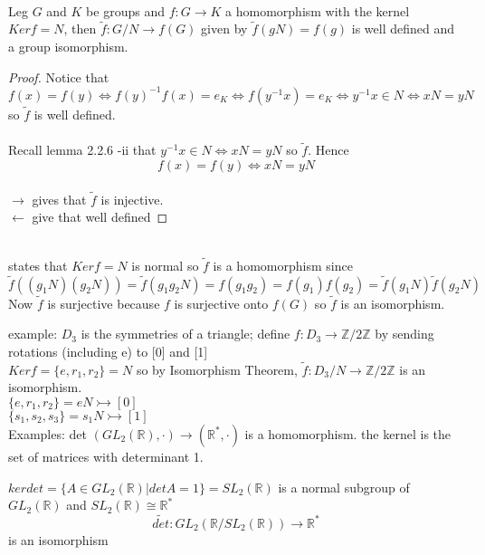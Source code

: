 \documentclass{article}
\begin{document}
\begin{theorem} \leavevmode\\ 
    Leg $G $ and $K$ be groups and $f: G \rightarrow K$ a homomorphism with the kernel $Ker f = N$, then $\tilde{f}: G /N \rightarrow f(G)$  given by $\tilde{f}(gN) = f(g)$ is well defined and a group isomorphism. 
\end{theorem}
\begin{proof}
    Notice that $f(x) = f(y) \iff f(y)^{-1} f(x) = e_K \iff f(y^{-1}x) = e_K \iff y^{-1}x \in N \iff xN = yN$ so $\tilde{f}$ is well defined. \\
   \\ Recall lemma 2.2.6 -ii that $y^{-1}x \in N \iff xN = yN$ so $\tilde{f}$. Hence $$f(x) = f(y) \iff xN = yN$$ \\ 
   $\rightarrow$ gives that $\tilde{f}$ is injective. \\
   $\leftarrow$ give that well defined
   \end{proof}

\begin{proposition}[2.4.9] \leavevmode \\ 
    states that $Ker f = N$ is normal so $\tilde{f}$ is a homomorphism since $\tilde{f}((g_1N)( g_2N)) = \tilde{f}(g_1 g_2 N) = f(g_1 g_2) = f(g_1) f(g_2) = \tilde{f}(g_1 N) \tilde{f}(g_2 N)$ \\ 
    Now $\tilde{f}$ is surjective because $f$ is surjective onto $f(G)$ so $\tilde{f}$ is an isomorphism. 
    
\end{proposition}
example: $D_3$ is the symmetries of a triangle; define $f: D_3 \rightarrow  \mathbb{Z} / 2 \mathbb{Z}$ by sending rotations (including e) to [0] and [1]
\\ 
$Ker f = \{e, r_1, r_2 \} = N $ so by Isomorphism Theorem, $\tilde{f}: D_3 / N \rightarrow \mathbb{Z} / 2\mathbb{Z}$ is an isomorphism. \\ 
$\{e, r_1, r_2\} = eN \rightarrowtail [0]$ \\
$\{s_1, s_2, s_3\} = s_1N \rightarrowtail [1]$ \\


Examples: det $(GL_2(\mathbb{R}), \cdot) \rightarrow (\mathbb{R}^*, \cdot)$ is a homomorphism. the kernel is the set of matrices with determinant 1. 

$ker det = \{A \in GL_2(\mathbb{R}) | det A = 1\} = SL_2(\mathbb{R})$ is a normal subgroup of $GL_2(\mathbb{R})$ and $SL_2(\mathbb{R}) \cong \mathbb{R}^*$
$$\tilde{det}: GL_2(\mathbb{R} / SL_2(\mathbb{R}) ) \rightarrow \mathbb{R}^*$$ is an isomorphism
\end{document}
